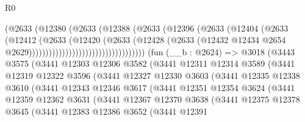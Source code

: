 \begin{lexlean}{R0}
\begin{coremodule}
                                          (@2633
                                            (@12380
                                              (@2633
                                                (@12388
                                                  (@2633
                                                    (@12396
                                                      (@2633
                                                        (@12404
                                                          (@2633
                                                            (@12412
                                                              (@2633
                                                                (@12420
                                                                  (@2633
                                                                    (@12428
                                                                      (@2633
                                                                        (@12432
                                                                          @12434
                                                                          @2654
                                                                          @2629)))))))))))))))))))))))))))))))))))
    (fun (__b : @2624) =>
    @3018
      (@3443
        @3575
        (@3441
          @12303
          @12306
          @3582
          (@3441
            @12311
            @12314
            @3589
            (@3441
              @12319
              @12322
              @3596
              (@3441
                @12327
                @12330
                @3603
                (@3441
                  @12335
                  @12338
                  @3610
                  (@3441
                    @12343
                    @12346
                    @3617
                    (@3441
                      @12351
                      @12354
                      @3624
                      (@3441
                        @12359
                        @12362
                        @3631
                        (@3441
                          @12367
                          @12370
                          @3638
                          (@3441
                            @12375
                            @12378
                            @3645
                            (@3441
                              @12383
                              @12386
                              @3652
                              (@3441
                                @12391

\end{coremodule}
\end{lexlean}
